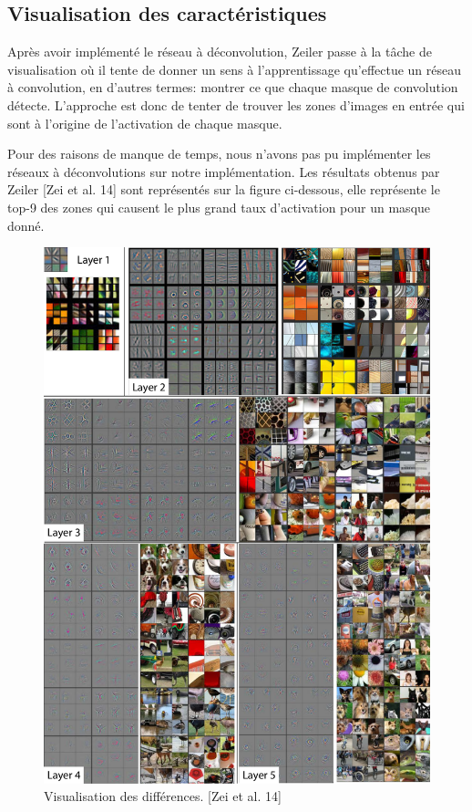 \subsection{Visualisation des caractéristiques}

	Après avoir implémenté le réseau à déconvolution, Zeiler passe à la tâche de visualisation où il tente de donner un sens à l'apprentissage qu'effectue un réseau à convolution, en d'autres termes: montrer ce que chaque masque de convolution détecte. L'approche est donc de tenter de trouver les zones d'images en entrée qui sont à l'origine de l'activation de chaque masque. 
	
	Pour des raisons de manque de temps, nous n'avons pas pu implémenter les réseaux à déconvolutions sur notre implémentation. Les résultats obtenus par Zeiler [Zei et al. 14] sont représentés sur la figure ci-dessous, elle représente le top-9 des zones qui causent le plus grand taux d'activation pour un masque donné.
 
\begin{figure}[H]
	\centering
		\includegraphics[width=5in]{Figures/visualisation.png}
	\caption[Res]{Visualisation des différences. [Zei et al. 14]}
	\label{fig:Electron}
\end{figure}


